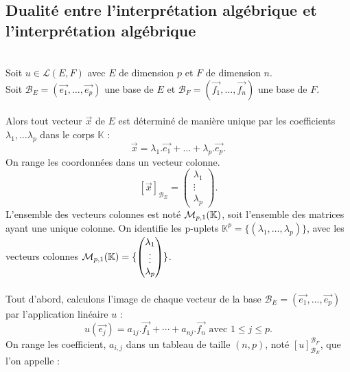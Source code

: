 \documentclass{book}
\begin{document}
\subsection{Dualité entre l'interprétation algébrique et l'interprétation algébrique}
\label{subsec:dualite}
\\ Soit  $u\in \mathcal{L}(E,F)$ avec $E$ de dimension $p$ et $F$ de dimension $n$.\\
Soit $\mathcal{B}_E=(\vec{e_1},\dots,\vec{e_p})$ une base de $E$ et $\mathcal{B}_F=(\vec{f_1},\dots,\vec{f_n})$ une base de $F$.\\
\\
Alors tout vecteur $\vec{x}$ de $E$ est déterminé de manière unique par les coefficients $\lambda_1,\dots \lambda_p$ dans le corps $\mathbb{K}$ :
$$ \vec{x}=\lambda_1.\vec{e_1}+\dots +\lambda_p.\vec{e_p}.$$
On range les coordonnées dans un vecteur colonne. 
 $$ \left[\vec{x}\right]_{\mathcal{B}_E}=\begin{pmatrix}\lambda_1\\\vdots\\\lambda_p\end{pmatrix}.$$
 L'ensemble des vecteurs colonnes est noté $\mathcal{M}_{p,1}(\mathbb{K})$, soit l'ensemble des matrices ayant une unique colonne. On identifie les p-uplets $\mathbb{K}^p=\{(\lambda_1,\dots,\lambda_p)\}$, avec les vecteurs colonnes $\mathcal{M}_{p,1}(\mathbb{K})=\{\begin{pmatrix}\lambda_1\\\vdots\\\lambda_p\end{pmatrix}\}$. \\
\\
Tout d'abord,  calculons l'image de chaque vecteur de la base $\mathcal{B}_E=(\vec{e_1},\dots,\vec{e_p})$ par l'application linéaire $u$ :
$$u(\vec{e_j})=a_{1j}.\vec{f_1}+\cdots +a_{nj}.\vec{f_n}\text{ avec } 1\leq j \leq p.$$
On range les coefficient, $a_{i,j}$ dans un tableau de taille $(n,p)$, noté $\left[u\right]_{\mathcal{B}_E}^{\mathcal{B}_F}$, que l'on appelle  :
\end{document}
